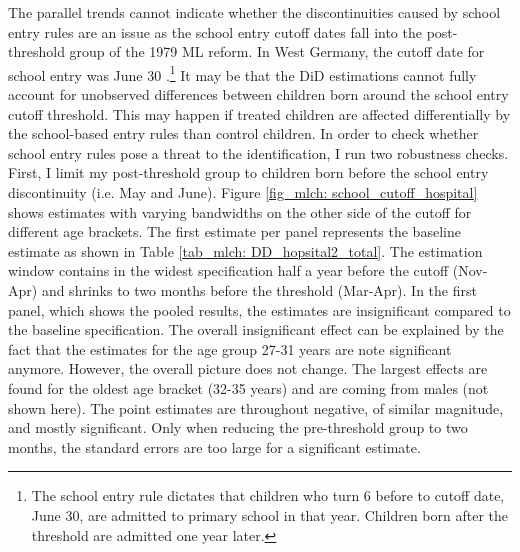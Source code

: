 The parallel trends cannot indicate whether the discontinuities caused by school entry rules are an issue as the school entry cutoff dates fall into the post-threshold group of the 1979 ML reform. In West Germany, the cutoff date for school entry was June 30 \citep{juerges2011}.\footnote{The school entry rule dictates that children who turn 6 before to cutoff date, June 30, are admitted to primary school in that year. Children born after the threshold are admitted one year later.} It may be that the DiD estimations cannot fully account for unobserved differences between children born around the school entry cutoff threshold. This may happen if treated children are affected differentially by the school-based entry rules than control children. In order to check whether school entry rules pose a threat to the identification, I run two robustness checks. First, I limit my post-threshold group to children born before the school entry discontinuity (i.e. May and June). Figure \ref{fig_mlch: school_cutoff_hospital} shows estimates with varying bandwidths on the other side of the cutoff for different age brackets. The first estimate per panel represents the baseline estimate as shown in Table \ref{tab_mlch: DD_hopsital2_total}. The estimation window contains in the widest specification half a year before the cutoff (Nov-Apr) and shrinks to two months before the threshold (Mar-Apr). In the first panel, which shows the pooled results, the estimates are insignificant compared to the baseline specification. The overall insignificant effect can be explained by the fact that the estimates for the age group 27-31 years are note significant anymore. However, the overall picture does not change. The largest effects are found for the oldest age bracket (32-35 years) {\color{red}and are coming from males (not shown here)}. The point estimates are throughout negative, of similar magnitude, and mostly significant. Only when reducing the pre-threshold group to two months, the standard errors are too large for a significant estimate.



